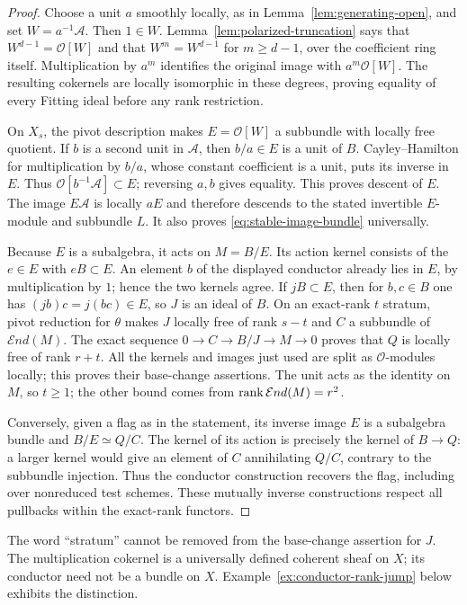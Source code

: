\begin{proof}
Choose a unit $a$ smoothly locally, as in
Lemma~\ref{lem:generating-open}, and set $W=a^{-1}\mathcal A$.
Then $1\in W$. Lemma~\ref{lem:polarized-truncation} says that
$W^{d-1}=\mathcal O[W]$ and that $W^m=W^{d-1}$ for $m\ge d-1$,
over the coefficient ring itself. Multiplication by $a^m$ identifies
the original image with $a^m\mathcal O[W]$. The resulting cokernels
are locally isomorphic in these degrees, proving equality of every
Fitting ideal before any rank restriction.

On $X_s$, the pivot description makes $E=\mathcal O[W]$ a subbundle
with locally free quotient. If $b$ is a second unit in $\mathcal A$,
then $b/a\in E$ is a unit of $B$. Cayley--Hamilton for multiplication
by $b/a$, whose constant coefficient is a unit, puts its inverse
in $E$. Thus $\mathcal O[b^{-1}\mathcal A]\subset E$; reversing $a,b$
gives equality. This proves descent of $E$. The image $E\mathcal A$
is locally $aE$ and therefore descends to the stated invertible
$E$-module and subbundle $L$. It also proves
\eqref{eq:stable-image-bundle} universally.

Because $E$ is a subalgebra, it acts on $M=B/E$. Its action kernel
consists of the $e\in E$ with $eB\subset E$. An element $b$ of the
displayed conductor already lies in $E$, by multiplication by $1$;
hence the two kernels agree. If $jB\subset E$, then for $b,c\in B$
one has $(jb)c=j(bc)\in E$, so $J$ is an ideal of $B$.
On an exact-rank $t$ stratum, pivot reduction for $\theta$ makes
$J$ locally free of rank $s-t$ and $C$ a subbundle of
$\mathcal E nd(M)$. The exact sequence
$0\to C\to B/J\to M\to0$ proves that $Q$ is locally free of
rank $r+t$. All the kernels and images just used are split as
$\mathcal O$-modules locally; this proves their base-change assertions.
The unit acts as the identity on $M$, so $t\ge1$; the other bound
comes from $\operatorname{rank}\mathcal E nd(M)=r^2$.

Conversely, given a flag as in the statement, its inverse image $E$
is a subalgebra bundle and $B/E\simeq Q/C$. The kernel of its action
is precisely the kernel of $B\to Q$: a larger kernel would give
an element of $C$ annihilating $Q/C$, contrary to the subbundle
injection. Thus the conductor construction recovers the flag,
including over nonreduced test schemes. These mutually inverse
constructions respect all pullbacks within the exact-rank functors.
\end{proof}

The word ``stratum'' cannot be removed from the base-change assertion
for $J$. The multiplication cokernel is a universally defined
coherent sheaf on $X$; its conductor need not be a bundle on $X$.
Example~\ref{ex:conductor-rank-jump} below exhibits the distinction.

